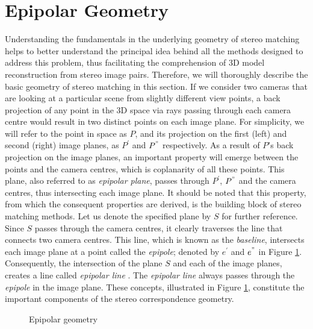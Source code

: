 \documentclass[12pt]{report}
\begin{document}
\section{Epipolar Geometry}
Understanding the fundamentals in the underlying geometry of stereo matching helps to better understand the principal idea behind all the methods designed to address this problem, 
thus facilitating the comprehension of 3D model reconstruction from stereo image pairs. Therefore, we will thoroughly describe the basic geometry of stereo matching in this section. \newline
If we consider two cameras that are looking at a particular scene from slightly different view points, a back projection of any point in the 3D space via rays passing through each camera centre
would result in two distinct points on each image plane. For simplicity, we will refer to the point in space as $P$, and its projection on the first (left) and second (right) image planes,
as $P^{'}$ and ${P}^{"}$ respectively. \newline
As a result of $P$'s back projection on the image planes, an important property will emerge between the points and the camera centres, which is coplanarity of all these points. 
This plane, also referred to as {\it epipolar plane}, passes through $P^{'}$, $P^{"}$ and the camera centres, thus intersecting each image plane. 
It should be noted that this property, from which the consequent properties are derived, is the building block of stereo matching methods. 
Let us denote the specified plane by $S$ for further reference. 
Since $S$ passes through the camera centres, it clearly traverses the line 
that connects two camera centres. This line, which is known as the {\it baseline}, intersects each image plane at a point called the {\it epipole}; denoted by ${e}^{'}$ and ${e}^{"}$
in Figure \ref{fig:epg}. 
Consequently, the intersection of the plane $S$ and each of the image planes, creates a line called {\it epipolar line} \cite{hart2000}. 
The {\it epipolar line} always passes through the {\it epipole} in the image plane. 
These concepts, illustrated in Figure \ref{fig:epg}, constitute the important components of the stereo correspondence geometry.

\begin{figure}[h!]
\centering

\caption{Epipolar geometry}
\label{fig:epg}
\end{figure} 
\end{document}
